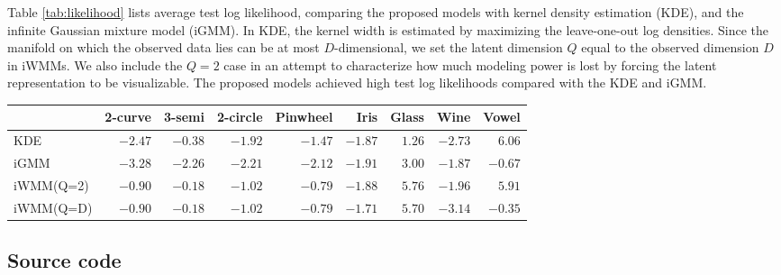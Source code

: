 Table \ref{tab:likelihood} lists average test log likelihood, comparing the proposed models
with kernel density estimation (KDE),
and the infinite Gaussian mixture model (iGMM).
In KDE, the kernel width is estimated by maximizing the leave-one-out log densities.
Since the manifold on which the observed data lies can be at most $D$-dimensional, we set the latent dimension $Q$ equal to the observed dimension $D$ in iWMMs.
We also include the $Q=2$ case in an attempt to characterize how much modeling power is lost by forcing the latent representation to be visualizable. 
The proposed models achieved high test log likelihoods compared with the KDE and iGMM.

\begin{table*}[ht!]
\centering
\caption[Predictive log-likelihood comparison]
{Average test log likelihood for evaluating density estimation performance.}
\label{tab:likelihood}
\begin{tabular}{lrrrrrrrr}
\hline
& 2-curve & 3-semi & 2-circle & Pinwheel & Iris  & Glass  & Wine  & Vowel  \\
\hline 
KDE & $-2.47$ & $-0.38$ & $-1.92$ & $-1.47$ & $\mathbf{-1.87}$ & $1.26$ & $-2.73$ & $\mathbf{6.06}$ \\
iGMM & $-3.28$ & $-2.26$ & $-2.21$ & $-2.12$ & $-1.91$ & $3.00$ & $\mathbf{-1.87}$ & $-0.67$ \\
iWMM(Q=2) & $\mathbf{-0.90}$ & $\mathbf{-0.18}$ & $\mathbf{-1.02}$ & $\mathbf{-0.79}$ & $\mathbf{-1.88}$ & $\mathbf{5.76}$ & $\mathbf{-1.96}$ & $\mathbf{5.91}$ \\
iWMM(Q=D) & $\mathbf{-0.90}$ & $\mathbf{-0.18}$ & $\mathbf{-1.02}$ & $\mathbf{-0.79}$ & $\mathbf{-1.71}$ & $\mathbf{5.70}$ & $-3.14$ & $-0.35$ \\
\hline
\end{tabular}
\end{table*}

\subsection{Source code}

